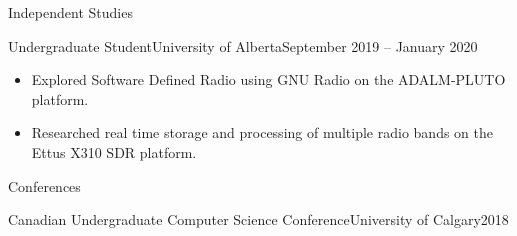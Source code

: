 \documentclass[]{mcdowellcv}
\begin{document}
\vspace*{-10pt}
\begin{cvsection}{Independent Studies}
  \begin{cvsubsection}{Undergraduate Student}{University of Alberta}{September 2019 -- January 2020}
    \vspace*{5pt}
    \begin{itemize}
      \item Explored Software Defined Radio using GNU Radio on the ADALM-PLUTO platform.
      \item Researched real time storage and processing of multiple radio bands on the Ettus X310 SDR platform.
    \end{itemize}
  \end{cvsubsection}
\end{cvsection}

\vspace*{-10pt}
\begin{cvsection}{Conferences}
  \begin{cvsubsection}{Canadian Undergraduate Computer Science Conference}{University of Calgary}{2018}
  \end{cvsubsection}
\end{cvsection}
\end{document}
